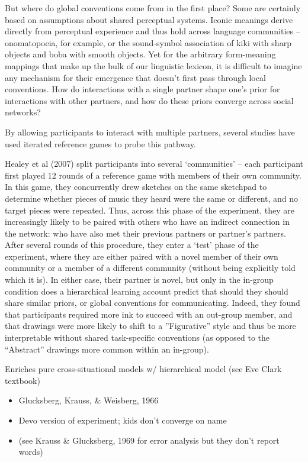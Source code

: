 \documentclass[11pt, floatsintext, jou]{apa6}
\begin{document}
But where do global conventions come from in the first place? Some are certainly based on assumptions about shared perceptual systems. Iconic meanings derive directly from perceptual experience and thus hold across language communities -- onomatopoeia, for example, or the sound-symbol association of kiki with sharp objects and boba with smooth objects. Yet for the arbitrary form-meaning mappings that make up the bulk of our linguistic lexicon, it is difficult to imagine any mechanism for their emergence that doesn't first pass through local conventions. How do interactions with a single partner shape one's prior for interactions with other partners, and how do these priors converge across social networks? 

By allowing participants to interact with multiple partners, several studies have used iterated reference games to probe this pathway. 

Healey et al (2007) split participants into several `communities' -- each participant first played 12 rounds of a reference game with members of their own community. In this game, they concurrently drew sketches on the same sketchpad to determine whether pieces of music they heard were the same or different, and no target pieces were repeated. Thus, across this phase of the experiment, they are increasingly likely to be paired with others who have an indirect connection in the network: who have also met their previous partners or partner's partners. After several rounds of this procedure, they enter a `test' phase of the experiment, where they are either paired with a novel member of their own community or a member of a different community (without being explicitly told which it is). In either case, their partner is novel, but only in the in-group condition does a hierarchical learning account predict that should they should share similar priors, or global conventions for communicating. Indeed, they found that participants required more ink to succeed with an out-group member, and that drawings were more likely to shift to a ''Figurative'' style and thus be more interpretable without shared task-specific conventions (as opposed to the ``Abstract'' drawings more common within an in-group). 

Enriches pure cross-situational models w/ hierarchical model (see Eve Clark textbook)

\begin{itemize}
\item Glucksberg, Krauss, \& Weisberg, 1966
\item Devo version of experiment; kids don't converge on name
\item (see Krauss \& Glucksberg, 1969 for error analysis but they don't report words)
\end{itemize}
\end{document}
